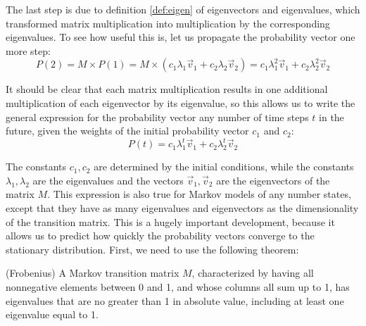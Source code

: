 \documentclass[
  letterpaper,
  DIV=11,
  numbers=noendperiod]{scrreprt}
\begin{document}
The last step is due to definition \ref{def:eigen} of eigenvectors and
eigenvalues, which transformed matrix multiplication into multiplication
by the corresponding eigenvalues. To see how useful this is, let us
propagate the probability vector one more step:
\[ P(2) = M \times P(1) =  M \times ( c_1 \lambda_1\vec v_1 + c_2 \lambda_2 \vec v_2) =  c_1 \lambda_1^2\vec v_1 + c_2 \lambda_2^2 \vec v_2 \]

It should be clear that each matrix multiplication results in one
additional multiplication of each eigenvector by its eigenvalue, so this
allows us to write the general expression for the probability vector any
number of time steps \(t\) in the future, given the weights of the
initial probability vector \(c_1\) and \(c_2\):
\[ P(t) =c_1 \lambda_1^t \vec v_1 +c_2 \lambda_2^t \vec v_2 \]

The constants \(c_1, c_2\) are determined by the initial conditions,
while the constants \(\lambda_1, \lambda_2\) are the eigenvalues and the
vectors \(\vec v_1, \vec v_2\) are the eigenvectors of the matrix \(M\).
This expression is also true for Markov models of any number states,
except that they have as many eigenvalues and eigenvectors as the
dimensionality of the transition matrix. This is a hugely important
development, because it allows us to predict how quickly the probability
vectors converge to the stationary distribution. First, we need to use
the following theorem:

\begin{tcolorbox}[enhanced jigsaw, coltitle=black, arc=.35mm, opacitybacktitle=0.6, breakable, bottomtitle=1mm, toptitle=1mm, titlerule=0mm, colback=white, leftrule=.75mm, rightrule=.15mm, colframe=quarto-callout-important-color-frame, colbacktitle=quarto-callout-important-color!10!white, opacityback=0, title=\textcolor{quarto-callout-important-color}{\faExclamation}\hspace{0.5em}{Theorem}, left=2mm, toprule=.15mm, bottomrule=.15mm]

(Frobenius) A Markov transition matrix \(M\), characterized by having
all nonnegative elements between 0 and 1, and whose columns all sum up
to 1, has eigenvalues that are no greater than 1 in absolute value,
including at least one eigenvalue equal to 1.

\end{tcolorbox}
\end{document}
